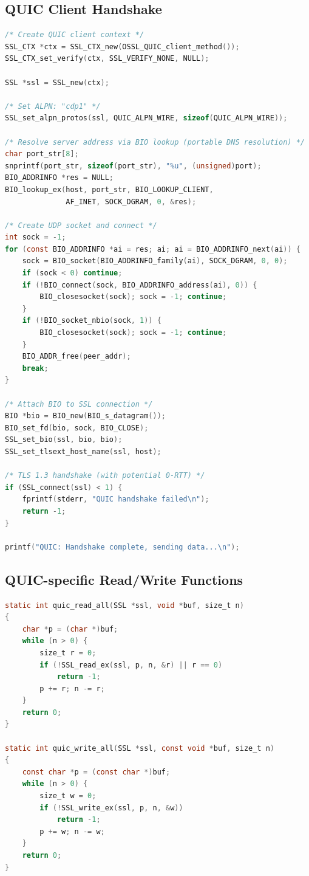 \documentclass[12pt,a4paper]{article}
\begin{document}
\subsection{QUIC Client Handshake}

\begin{lstlisting}[caption=QUIC Client: Connection Establishment,label=lst:quic_client,language=C]
/* Create QUIC client context */
SSL_CTX *ctx = SSL_CTX_new(OSSL_QUIC_client_method());
SSL_CTX_set_verify(ctx, SSL_VERIFY_NONE, NULL);

SSL *ssl = SSL_new(ctx);

/* Set ALPN: "cdp1" */
SSL_set_alpn_protos(ssl, QUIC_ALPN_WIRE, sizeof(QUIC_ALPN_WIRE));

/* Resolve server address via BIO lookup (portable DNS resolution) */
char port_str[8];
snprintf(port_str, sizeof(port_str), "%u", (unsigned)port);
BIO_ADDRINFO *res = NULL;
BIO_lookup_ex(host, port_str, BIO_LOOKUP_CLIENT,
              AF_INET, SOCK_DGRAM, 0, &res);

/* Create UDP socket and connect */
int sock = -1;
for (const BIO_ADDRINFO *ai = res; ai; ai = BIO_ADDRINFO_next(ai)) {
    sock = BIO_socket(BIO_ADDRINFO_family(ai), SOCK_DGRAM, 0, 0);
    if (sock < 0) continue;
    if (!BIO_connect(sock, BIO_ADDRINFO_address(ai), 0)) {
        BIO_closesocket(sock); sock = -1; continue;
    }
    if (!BIO_socket_nbio(sock, 1)) {
        BIO_closesocket(sock); sock = -1; continue;
    }
    BIO_ADDR_free(peer_addr);
    break;
}

/* Attach BIO to SSL connection */
BIO *bio = BIO_new(BIO_s_datagram());
BIO_set_fd(bio, sock, BIO_CLOSE);
SSL_set_bio(ssl, bio, bio);
SSL_set_tlsext_host_name(ssl, host);

/* TLS 1.3 handshake (with potential 0-RTT) */
if (SSL_connect(ssl) < 1) {
    fprintf(stderr, "QUIC handshake failed\n");
    return -1;
}

printf("QUIC: Handshake complete, sending data...\n");
\end{lstlisting}

\subsection{QUIC-specific Read/Write Functions}

\begin{lstlisting}[caption=QUIC Stream I/O Helpers,label=lst:quic_io,language=C]
static int quic_read_all(SSL *ssl, void *buf, size_t n)
{
    char *p = (char *)buf;
    while (n > 0) {
        size_t r = 0;
        if (!SSL_read_ex(ssl, p, n, &r) || r == 0)
            return -1;
        p += r; n -= r;
    }
    return 0;
}

static int quic_write_all(SSL *ssl, const void *buf, size_t n)
{
    const char *p = (const char *)buf;
    while (n > 0) {
        size_t w = 0;
        if (!SSL_write_ex(ssl, p, n, &w))
            return -1;
        p += w; n -= w;
    }
    return 0;
}
\end{lstlisting}
\end{document}
